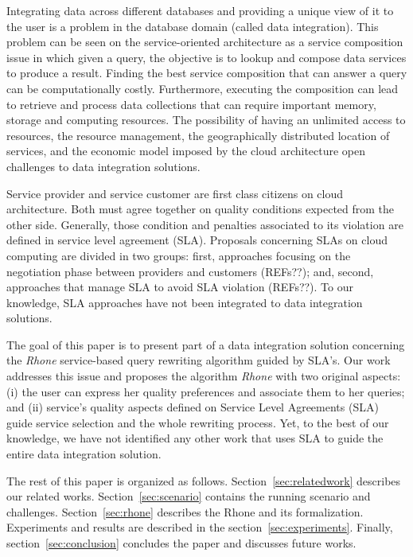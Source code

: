 Integrating data across different databases and providing a unique view of it to the user is a problem in the database domain (called data integration).
This problem can be seen on the service-oriented architecture as a service composition issue in which given a query, the objective is to lookup and compose data services to produce a result. 
%
Finding the best service composition that can answer a query can be computationally costly. 
Furthermore, executing the composition can lead to retrieve and process data collections that can require important memory, storage and computing resources.
The possibility of having an unlimited access to resources, the resource management, the geographically distributed location of services, and the economic model imposed by the cloud architecture open challenges to data integration solutions.

Service provider and service customer are first class citizens on cloud architecture.
Both must agree together on quality conditions expected from the other side. 
Generally, those condition and penalties associated to its violation are defined in service level 
agreement (SLA). 
Proposals concerning SLAs on cloud computing are divided in two groups: first, approaches focusing on the negotiation phase between providers and customers (REFs??); and, second, approaches that manage SLA to avoid SLA violation (REFs??).
To our knowledge, SLA approaches have not been integrated to data integration solutions.

The goal of this paper is to present part of a data integration solution concerning the \textit{Rhone} service-based query rewriting algorithm guided by SLA's. 
Our work addresses this issue and proposes the algorithm \textit{Rhone} with two original aspects: (i) the user can express her quality preferences and associate them to her queries; and (ii)  service's quality aspects defined on Service Level Agreements (SLA) guide service selection and the whole rewriting process.
Yet, to the best of our knowledge, we have not identified any other work that uses SLA to guide the entire data integration solution.

The rest of this paper is organized as follows. 
Section~\ref{sec:relatedwork} describes our related works. 
Section~\ref{sec:scenario} contains the running scenario and challenges.
Section~\ref{sec:rhone} describes the Rhone and its formalization. 
Experiments and results are described in the section~\ref{sec:experiments}. 
Finally, section~\ref{sec:conclusion} concludes the paper and discusses future works.
